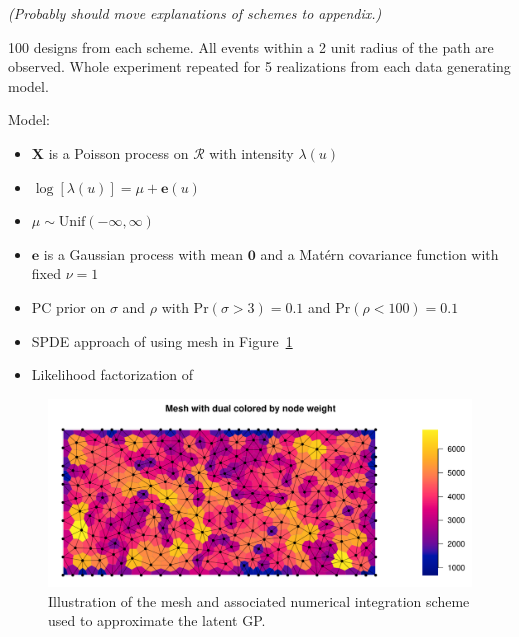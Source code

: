 \documentclass[review]{elsarticle}
\begin{document}
{\it (Probably should move explanations of schemes to appendix.)}

100 designs from each scheme. All events within a 2 unit radius of the path are
observed. Whole experiment repeated for 5 realizations from each data
generating model.

Model:

\begin{itemize}
\item \(\mathbf{X}\) is a Poisson process on \(\mathcal{R}\) with intensity
\(\lambda(u)\)
\item \(\log[\lambda(u)] = \mu + \mathbf{e}(u)\)
\item \(\mu \sim \mathrm{Unif}(-\infty, \infty)\)
\item \(\mathbf{e}\) is a Gaussian process with mean \(\mathbf{0}\) and a
Mat\'{e}rn covariance function with fixed \(\nu = 1\)
\item PC prior on \(\sigma\) and \(\rho\) with \(\mathrm{Pr}(\sigma > 3) = 0.1\)
and \(\mathrm{Pr}(\rho < 100) = 0.1\) \citep{fuglstadetal,simpsonpc}
\item SPDE approach of \citet{lindgrenetal} using mesh in Figure~\ref{meshfull}
\item Likelihood factorization of \citet{simpsonetal}
\end{itemize}

\begin{figure}
\includegraphics[width=5in]{mesh_full.pdf}
\caption{Illustration of the mesh and associated numerical integration scheme
used to approximate the latent GP.}
\label{meshfull}
\end{figure}


\end{document}
